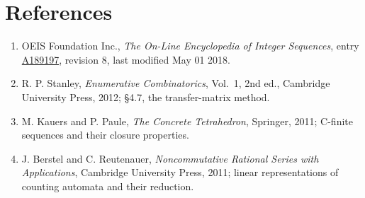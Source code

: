 \documentclass[11pt]{article}
\theoremstyle{definition}
\begin{document}
\section{References}

\begin{enumerate}

\item OEIS Foundation Inc., \emph{The On-Line Encyclopedia of Integer Sequences}, entry \href{https://oeis.org/A189197}{A189197}, revision 8, last modified May 01 2018.

\item R. P. Stanley, \emph{Enumerative Combinatorics}, Vol.~1, 2nd ed., Cambridge University Press, 2012; \S4.7, the transfer-matrix method.

\item M. Kauers and P. Paule, \emph{The Concrete Tetrahedron}, Springer, 2011; C-finite sequences and their closure properties.

\item J. Berstel and C. Reutenauer, \emph{Noncommutative Rational Series with Applications}, Cambridge University Press, 2011; linear representations of counting automata and their reduction.

\end{enumerate}
\end{document}
